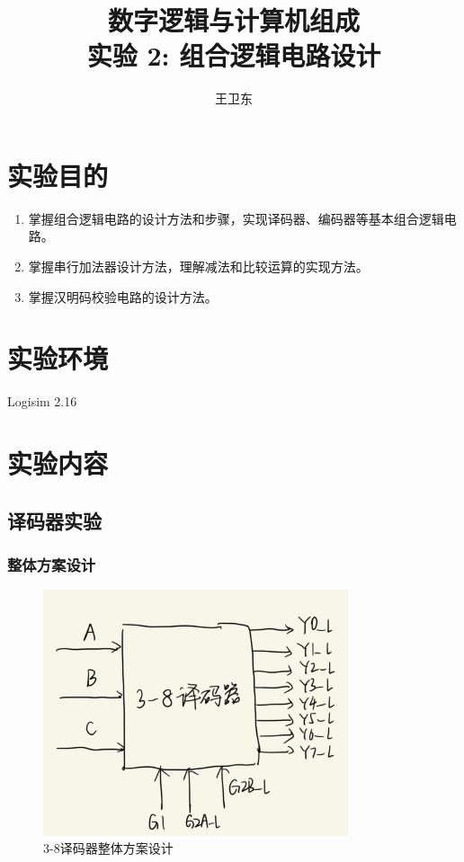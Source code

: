 \documentclass{article}
\title{数字逻辑与计算机组成\\ {\small 实验 2: 组合逻辑电路设计}}
\author{王卫东\quad 221900332}
\date{\zhtoday}
\begin{document}
    \maketitle

    \section{实验目的}

    \begin{enumerate}
        \item 掌握组合逻辑电路的设计方法和步骤，实现译码器、编码器等基本组合逻辑电路。
        \item 掌握串行加法器设计方法，理解减法和比较运算的实现方法。
        \item 掌握汉明码校验电路的设计方法。
    \end{enumerate}

    \section{实验环境}

    Logisim 2.16

    \section{实验内容}
    
    \subsection{译码器实验}

    \subsubsection{整体方案设计}
    \begin{figure}[H]
    \centering
    \includegraphics[width=0.8\textwidth]{1.1.png}
    \caption{3-8译码器整体方案设计}
    \end{figure}
\end{document}
